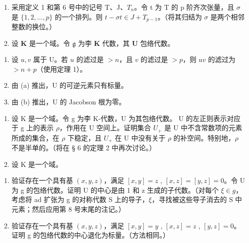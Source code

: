 
\begin{enumerate}
\def\labelenumi{\arabic{enumi}.}
\item
  采用定义 1 和第 6 号中的记号 T、J、\(T_{n}\)。令 t 为 T 的 p 阶齐次张量，且 \(\sigma\) 是 \(\{1, 2, \ldots, p\}\) 的一个排列。则 \(t - \sigma t \in J + T_{p-1}\)。（将其归结为 \(\sigma\) 是两个相邻整数的换位。）
\item
  设 \(\mathbf{K}\) 是一个域。令 \(\mathfrak{g}\) 为李 \(\mathbf{K}\) 代数，其 \(\mathbf{U}\) 包络代数。
\end{enumerate}

\begin{enumerate}
\def\labelenumi{(\alph{enumi})}
\item
  设 \(u, v\) 属于 U。若 \(u\) 的滤过是 \(> n\)，且 \(v\) 的滤过是 \(> p\)，则 \(uv\) 的滤过为 \(> n + p\)（使用定理 1）。
\item
  由 (a) 推出，U 的可逆元素只有标量。
\item
  由 (b) 推出，U 的 Jacobson 根为零。
\end{enumerate}

\begin{enumerate}
\def\labelenumi{\arabic{enumi}.}
\setcounter{enumi}{2}
\item
  设 K 是一个域。令 g 为李 K-代数，U 为其包络代数。 U 的左正则表示对应于 g 上的表示 \(\rho\)，作用在 U 空间上。证明集合 \(U_{+}\) 是 U 中不含常数项的元素所成的集合，在 \(\rho\) 下稳定，且 \(U_{+}\) 在 U 中没有关于 \(\rho\) 的补空间。特别地，\(\rho\) 不是半单的。（将在 § 6 的定理 2 中再次讨论。）
\item
  设 K 是一个域。
\end{enumerate}

\begin{enumerate}
\def\labelenumi{(\alph{enumi})}
\item
  验证存在一个具有基 \((x, y, z)\)，满足 \([x, y] = z\) , \([x, z] = [y, z] = 0\)。令 U 为 g 的包络代数。证明 U 的中心是由 1 和 z 生成的子代数。（对每个 \(\xi \in g\)，考虑将 ad 扩张为 g 的对称代数 S 上的导子，\(\xi\)，寻找被这些导子消去的 S 中元素；然后应用第 8 号末尾的注记。）
\item
  验证存在一个具有基 \((x, y, z)\)，满足 \([x, y] = y\) , \([x, z] = z\) , \([y, z] = 0\)。证明 g 的包络代数的中心退化为标量。（方法相同。）
\end{enumerate}


